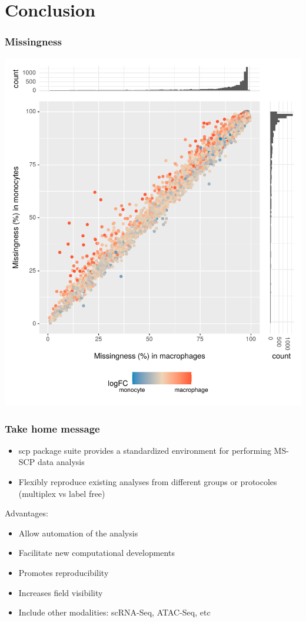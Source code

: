 \documentclass{beamer}
\newcommand{\hcode}[2][lgray]{{\ttfamily\color{vdgray}\colorbox{#1}{#2}}}
\newcommand{\frametitlesection}[1]{\frametitle{\centering #1 \footnotesize \hspace{0pt plus 1 filll} \insertsection}}
\begin{document}

\section{Conclusion}

\begin{frame}
    \frametitlesection{Missingness}
    
    \centering
    \includegraphics[width=.7\linewidth]{figs/missingness.pdf}
    
\end{frame}

\begin{frame}
    \frametitlesection{Take home message}
    
    \begin{itemize}
        \item{\hcode{scp} package suite provides a standardized environment for 
        performing MS-SCP data analysis}
        \item{Flexibly reproduce existing analyses from different groups or 
        protocoles (multiplex vs label free)}
    \end{itemize}
    
    \bigskip
    
    Advantages:
    
    \begin{itemize}
        \item{Allow automation of the analysis}
        \item{Facilitate new computational developments}
        \item{Promotes reproducibility}
        \item{Increases field visibility}
        \item{Include other modalities: scRNA-Seq, ATAC-Seq, etc}
    \end{itemize}
    
\end{frame}
\end{document}

